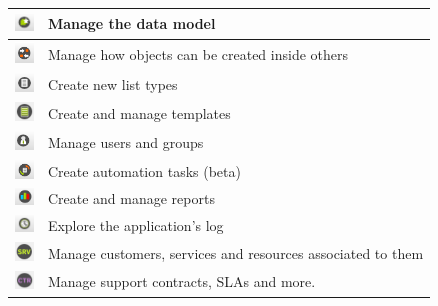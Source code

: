\documentclass[a4paper]{article}
\begin{document}
\begin{table}[h!]
\begin{tabular}{cl}
			\midrule
			\includegraphics[width=0.5cm]{img/icon_data_model_manager.png} & Manage the data model\\
			\midrule
			\includegraphics[width=0.5cm]{img/icon_containment_manager.png} & Manage how objects can be created inside others\\
			\midrule
			\includegraphics[width=0.5cm]{img/icon_list_type_manager.png} & Create new list types\\
			\midrule
			\includegraphics[width=0.5cm]{img/icon_template_manager.png} & Create and manage templates\\
			\midrule
			\includegraphics[width=0.5cm]{img/icon_user_manager.png} & Manage users and groups\\
			\midrule
			\includegraphics[width=0.5cm]{img/icon_task_manager.png} & Create automation tasks (beta)\\
			\midrule
			\includegraphics[width=0.5cm]{img/icon_reports.png} & Create and manage reports\\
			\midrule
			\includegraphics[width=0.5cm]{img/icon_audit_trail.png} & Explore the application's log\\
			\midrule
			\includegraphics[width=0.5cm]{img/icon_service_manager.png} & Manage customers, services and resources associated to them\\
			\midrule
			\includegraphics[width=0.5cm]{img/icon_contract_manager.png} & Manage support contracts, SLAs and more. \\

\end{tabular}
\end{table}
\end{document}
